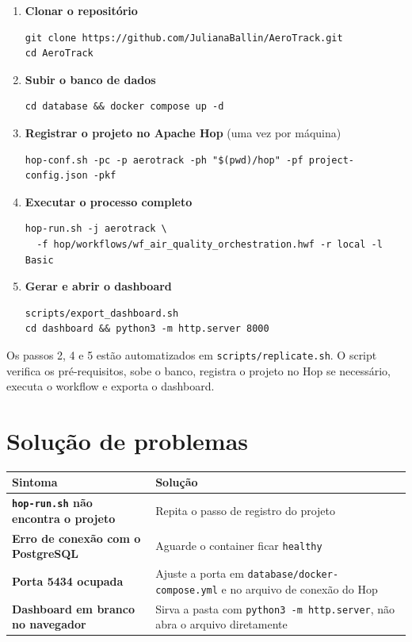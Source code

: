 \documentclass[12pt,a4paper,openany]{report}
\begin{document}
\begin{enumerate}
  \item \textbf{Clonar o repositório}
  \begin{lstlisting}
git clone https://github.com/JulianaBallin/AeroTrack.git
cd AeroTrack
  \end{lstlisting}
  \item \textbf{Subir o banco de dados}
  \begin{lstlisting}
cd database && docker compose up -d
  \end{lstlisting}
  \item \textbf{Registrar o projeto no Apache Hop} (uma vez por máquina)
  \begin{lstlisting}
hop-conf.sh -pc -p aerotrack -ph "$(pwd)/hop" -pf project-config.json -pkf
  \end{lstlisting}
  \item \textbf{Executar o processo completo}
  \begin{lstlisting}
hop-run.sh -j aerotrack \
  -f hop/workflows/wf_air_quality_orchestration.hwf -r local -l Basic
  \end{lstlisting}
  \item \textbf{Gerar e abrir o dashboard}
  \begin{lstlisting}
scripts/export_dashboard.sh
cd dashboard && python3 -m http.server 8000
  \end{lstlisting}
\end{enumerate}

\begin{statusbox}
Os passos 2, 4 e 5 estão automatizados em \texttt{scripts/replicate.sh}. O
script verifica os pré-requisitos, sobe o banco, registra o projeto no Hop se
necessário, executa o workflow e exporta o dashboard.
\end{statusbox}

\section{Solução de problemas}

\small
\begin{longtable}{>{\bfseries}p{} p{}}
\toprule
Sintoma & Solução \\
\midrule
\endhead
\texttt{hop-run.sh} não encontra o projeto & Repita o passo de registro do projeto \\
Erro de conexão com o PostgreSQL & Aguarde o container ficar \texttt{healthy} \\
Porta 5434 ocupada & Ajuste a porta em \texttt{database/docker-compose.yml} e no arquivo de conexão do Hop \\
Dashboard em branco no navegador & Sirva a pasta com \texttt{python3 -m http.server}, não abra o arquivo diretamente \\
\bottomrule
\end{longtable}
\normalsize
\end{document}
